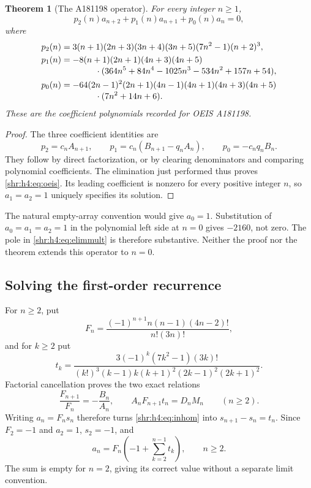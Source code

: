 \documentclass[11pt,letterpaper]{article}
\numberwithin{equation}{section}
\newtheorem{theorem}{Theorem}[section]
\theoremstyle{definition}
\newcommand{\1}{\mathbf 1}
\begin{document}
\begin{theorem}[The A181198 operator]
\label{shr:h4:thm:oeis}
For every integer $n\ge1$,
\begin{equation}
 p_2(n)a_{n+2}+p_1(n)a_{n+1}+p_0(n)a_n=0,
 \label{shr:h4:eq:oeis}
\end{equation}
where
\begin{align}
 p_2(n)&=3(n+1)(2n+3)(3n+4)(3n+5)(7n^2-1)(n+2)^3,\notag\\
 p_1(n)&=-8(n+1)(2n+1)(4n+3)(4n+5)\notag\\[-3pt]
 &\hspace{14mm}\cdot
 (364n^5+84n^4-1025n^3-534n^2+157n+54),\label{shr:h4:eq:poperator}\\
 p_0(n)&=-64(2n-1)^2(2n+1)(4n-1)(4n+1)(4n+3)(4n+5)\notag\\[-3pt]
 &\hspace{14mm}\cdot(7n^2+14n+6).\notag
\end{align}
These are the coefficient polynomials recorded for OEIS A181198.
\end{theorem}
\begin{proof}
The three coefficient identities are
\[
 p_2=c_nA_{n+1},\qquad
 p_1=c_n(B_{n+1}-q_nA_n),\qquad p_0=-c_nq_nB_n.
\]
They follow by direct factorization, or by clearing denominators and
comparing polynomial coefficients. The elimination just performed thus
proves \eqref{shr:h4:eq:oeis}. Its leading coefficient is nonzero for every
positive integer $n$, so $a_1=a_2=1$ uniquely specifies its solution.
\end{proof}

The natural empty-array convention would give $a_0=1$. Substitution of
$a_0=a_1=a_2=1$ in the polynomial left side at $n=0$ gives $-2160$, not
zero. The pole in \eqref{shr:h4:eq:elimmult} is therefore substantive. Neither
the proof nor the theorem extends this operator to $n=0$.

\subsection{Solving the first-order recurrence}
For $n\ge2$, put
\begin{equation}
 F_n=\frac{(-1)^{n+1}n(n-1)(4n-2)!}{n!(3n)!},
 \label{shr:h4:eq:F}
\end{equation}
and for $k\ge2$ put
\begin{equation}
 t_k=\frac{3(-1)^k(7k^2-1)(3k)!}
 {(k!)^3(k-1)k(k+1)^2(2k-1)^2(2k+1)^2}.
 \label{shr:h4:eq:t}
\end{equation}
Factorial cancellation proves the two exact relations
\begin{equation}
 \frac{F_{n+1}}{F_n}=-\frac{B_n}{A_n},\qquad
 A_nF_{n+1}t_n=D_nM_n\qquad(n\ge2).
 \label{shr:h4:eq:variation}
\end{equation}
Writing $a_n=F_ns_n$ therefore turns \eqref{shr:h4:eq:inhom} into
$s_{n+1}-s_n=t_n$. Since $F_2=-1$ and $a_2=1$, $s_2=-1$, and
\begin{equation}
 a_n=F_n\left(-1+\sum_{k=2}^{n-1}t_k\right),\qquad n\ge2.
 \label{shr:h4:eq:factorialsum}
\end{equation}
The sum is empty for $n=2$, giving its correct value without a separate
limit convention.
\end{document}
